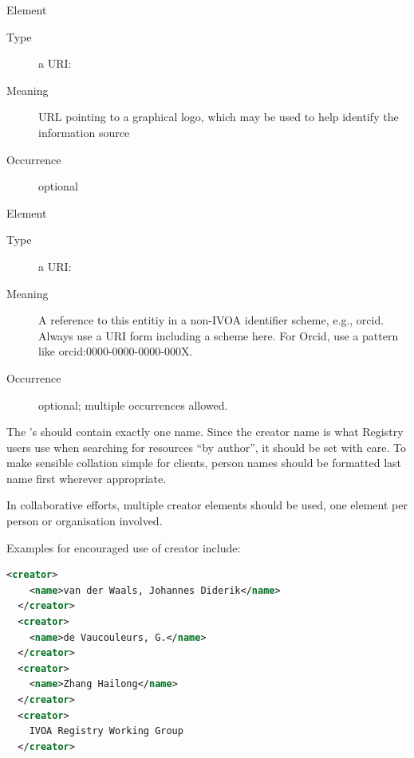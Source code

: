 \documentclass[11pt,a4paper]{ivoa}
\begin{document}
\begin{generated}
\begin{bigdescription}
\begin{description}
\end{description}
\item[Element \xmlel{logo}]
\begin{description}
\item[Type] a URI: 
\item[Meaning] 
                URL pointing to a graphical logo, which may be used to help 
                identify the information source
              
\item[Occurrence] optional

\end{description}
\item[Element \xmlel{altIdentifier}]
\begin{description}
\item[Type] a URI: 
\item[Meaning] 
                 A reference to this entitiy in a non-IVOA identifier
                 scheme, e.g., orcid.  Always use a URI form including
                 a scheme here.  For Orcid, use a pattern like
                 orcid:0000-0000-0000-000X.
              
\item[Occurrence] optional; multiple occurrences allowed.

\end{description}


\end{bigdescription}\endgroup

\endgroup
\end{generated}


The 's  should contain exactly one name.
Since the creator name is what Registry users use when searching for
resources ``by author'', it should be set with care.  To make sensible
collation simple for clients, person names should be formatted last name
first wherever appropriate.

In collaborative efforts, multiple creator elements should be used, one
element per person or organisation involved.

Examples for encouraged use of creator include:

\begin{lstlisting}[language=XML,basicstyle=\footnotesize]
  <creator>
    <name>van der Waals, Johannes Diderik</name>
  </creator>
  <creator>
    <name>de Vaucouleurs, G.</name>
  </creator>
  <creator>
    <name>Zhang Hailong</name>
  </creator>
  <creator>
    IVOA Registry Working Group
  </creator>
\end{lstlisting}
\end{document}
